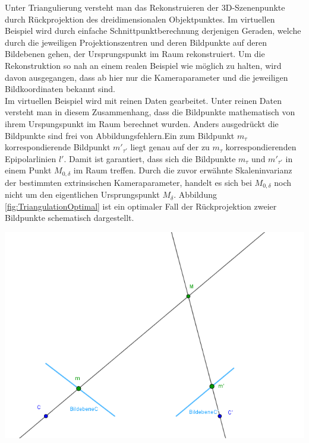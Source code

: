 Unter Triangulierung versteht man das Rekonstruieren der 3D-Szenenpunkte durch Rückprojektion des dreidimensionalen Objektpunktes. Im virtuellen Beispiel wird durch einfache Schnittpunktberechnung derjenigen Geraden, welche durch die jeweiligen Projektionszentren und deren Bildpunkte auf deren Bildebenen gehen, der Ursprungspunkt im Raum rekonstruiert. Um die Rekonstruktion so nah an einem realen Beispiel wie möglich zu halten, wird davon ausgegangen, dass ab hier nur die Kameraparameter und die jeweiligen Bildkoordinaten bekannt sind.\\

Im virtuellen Beispiel wird mit reinen Daten gearbeitet. Unter reinen Daten versteht man in diesem Zusammenhang, dass die Bildpunkte mathematisch von ihrem Urspungspunkt im Raum berechnet wurden. Anders ausgedrückt die Bildpunkte sind frei von Abbildungsfehlern.Ein zum Bildpunkt $m_\tau$ korrespondierende Bildpunkt $m'_{\tau'}$ liegt genau auf der zu $m_\tau$ korrespondierenden Epipolarlinien $l'$. Damit ist garantiert, dass sich die Bildpunkte $m_\tau$ und $m'_{\tau'}$ in einem Punkt $M_{0,\delta}$ im Raum treffen. Durch die zuvor erwähnte Skaleninvarianz der bestimmten extrinsischen Kameraparameter, handelt es sich bei  $M_{0,\delta}$ noch nicht um den eigentlichen Ursprungspunkt $M_\delta$. Abbildung \ref{fig:TriangulationOptimal} ist ein optimaler Fall der Rückprojektion zweier Bildpunkte schematisch dargestellt.

\begin{minipage}{\linewidth}
	\centering
	\includegraphics[width=0.8\linewidth]{images/optimaleTriangulierung.png}
	\label{fig:TriangulationOptimal}
\end{minipage}\\ \\


